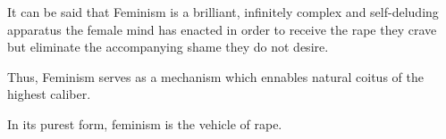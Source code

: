 It can be said that Feminism is a brilliant, infinitely complex and self-deluding apparatus the female mind has 
enacted in order to receive the rape they crave but eliminate the accompanying shame they do not desire.

Thus, Feminism serves as a mechanism which ennables natural coitus of the highest caliber.

In its purest form, feminism is the vehicle of rape.
